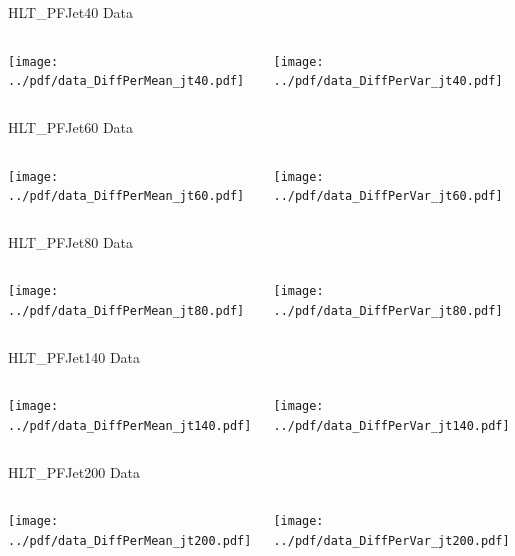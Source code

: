 \documentclass[9pt]{beamer}
\begin{document}
\begin{frame}[t]{HLT\_PFJet40 Data}
\begin{columns}[T]
  \begin{column}{.5\textwidth}
  \texttt{[image: ../pdf/data\_DiffPerMean\_jt40.pdf]}
  \end{column}
  \begin{column}{.5\textwidth}
  \texttt{[image: ../pdf/data\_DiffPerVar\_jt40.pdf]}
  \end{column}
\end{columns}
\end{frame}

\begin{frame}[t]{HLT\_PFJet60 Data}
\begin{columns}[T]
  \begin{column}{.5\textwidth}
  \texttt{[image: ../pdf/data\_DiffPerMean\_jt60.pdf]}
  \end{column}
  \begin{column}{.5\textwidth}
  \texttt{[image: ../pdf/data\_DiffPerVar\_jt60.pdf]}
  \end{column}
\end{columns}
\end{frame}

\begin{frame}[t]{HLT\_PFJet80 Data}
\begin{columns}[T]
  \begin{column}{.5\textwidth}
  \texttt{[image: ../pdf/data\_DiffPerMean\_jt80.pdf]}
  \end{column}
  \begin{column}{.5\textwidth}
  \texttt{[image: ../pdf/data\_DiffPerVar\_jt80.pdf]}
  \end{column}
\end{columns}
\end{frame}

\begin{frame}[t]{HLT\_PFJet140 Data}
\begin{columns}[T]
  \begin{column}{.5\textwidth}
  \texttt{[image: ../pdf/data\_DiffPerMean\_jt140.pdf]}
  \end{column}
  \begin{column}{.5\textwidth}
  \texttt{[image: ../pdf/data\_DiffPerVar\_jt140.pdf]}
  \end{column}
\end{columns}
\end{frame}

\begin{frame}[t]{HLT\_PFJet200 Data}
\begin{columns}[T]
  \begin{column}{.5\textwidth}
  \texttt{[image: ../pdf/data\_DiffPerMean\_jt200.pdf]}
  \end{column}
  \begin{column}{.5\textwidth}
  \texttt{[image: ../pdf/data\_DiffPerVar\_jt200.pdf]}
  \end{column}
\end{columns}
\end{frame}
\end{document}
